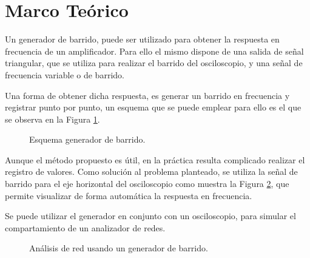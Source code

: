   \section{Marco Teórico}
    
Un generador de barrido, puede ser utilizado para obtener la respuesta en frecuencia 
de un amplificador. Para ello el mismo dispone de una salida de señal triangular, que 
se utiliza para realizar el barrido del osciloscopio, y una señal de frecuencia variable 
o de barrido.

Una forma de obtener dicha respuesta, es generar un barrido en frecuencia 
y registrar punto por punto, un esquema que se puede emplear para ello es el que 
se observa en la Figura \ref{fig:GenBarrido}.

\begin{figure}[H]
  \centering
    \caption{Esquema generador de barrido.}
    \label{fig:GenBarrido}
\end{figure}

Aunque el método propuesto es útil, en la práctica resulta complicado realizar el 
registro de valores. Como solución al problema planteado, se utiliza la señal de barrido para 
el eje horizontal del osciloscopio como muestra la Figura \ref{fig:GenBarridoRed}, que 
permite visualizar de forma automática la respuesta en frecuencia. 

Se puede utilizar el generador en conjunto con un osciloscopio, para simular el 
compartamiento de un analizador de redes.

\begin{figure}[H]
  \centering
    \caption{Análisis de red usando un generador de barrido.}
    \label{fig:GenBarridoRed}
\end{figure}

